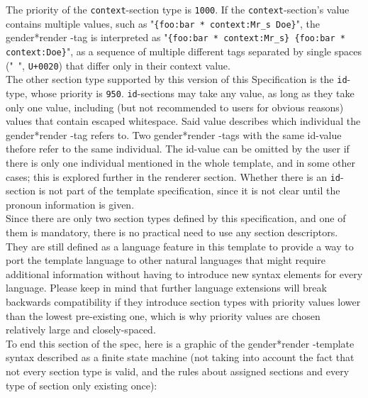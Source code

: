 \documentclass{article}
\newcommand{\GenderRender}{
    gender*render
}
\begin{document}

    The priority of the \texttt{context}-section type is \texttt{1000}.
    If the \texttt{context}-section's value contains multiple values, such as "\texttt{\{foo:bar * context:Mr\_s Doe\}}", the \GenderRender-tag is interpreted as "\texttt{\{foo:bar * context:Mr\_s\} \{foo:bar * context:Doe\}}", as a sequence of multiple different tags separated by single spaces ("\texttt{ }", \texttt{U+0020}) that differ only in their context value.\\

    The other section type supported by this version of this Specification is the \texttt{id}-type, whose priority is \texttt{950}.
    \texttt{id}-sections may take any value, as long as they take only one value, including (but not recommended to users for obvious reasons) values that contain escaped whitespace.
    Said value describes which individual the \GenderRender-tag refers to.
    Two \GenderRender-tags with the same id-value thefore refer to the same individual.
    The id-value can be omitted by the user if there is only one individual mentioned in the whole template, and in some other cases;
    this is explored further in the renderer section.
    Whether there is an \texttt{id}-section is not part of the template specification, since it is not clear until the pronoun information is given.\\

    Since there are only two section types defined by this specification, and one of them is mandatory, there is no practical need to use any section descriptors.
    They are still defined as a language feature in this template to provide a way to port the template language to other natural languages that might require additional information without having to introduce new syntax elements for every language.
    Please keep in mind that further language extensions will break backwards compatibility if they introduce section types with priority values lower than the lowest pre-existing one, which is why priority values are chosen relatively large and closely-spaced.\\

    To end this section of the spec, here is a graphic of the \GenderRender-template syntax described as a finite state machine (not taking into account the fact that not every section type is valid, and the rules about assigned sections and every type of section only existing once):\\
\end{document}
